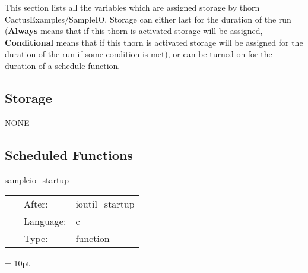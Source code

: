 \documentclass{article}
\begin{document}
\noindent This section lists all the variables which are assigned storage by thorn CactusExamples/SampleIO.  Storage can either last for the duration of the run ({\bf Always} means that if this thorn is activated storage will be assigned, {\bf Conditional} means that if this thorn is activated storage will be assigned for the duration of the run if some condition is met), or can be turned on for the duration of a schedule function.


\subsection*{Storage}NONE
\subsection*{Scheduled Functions}
\vspace{5mm}


\hspace{5mm} sampleio\_startup 

\hspace{5mm}{\it startup routine } 


\hspace{5mm}

 \begin{tabular*}{160mm}{cll} 
~ & After:  & ioutil\_startup \\ 
~ & Language:  & c \\ 
~ & Type:  & function \\ 
\end{tabular*} 



\vspace{5mm}\parskip = 10pt 
\end{document}
